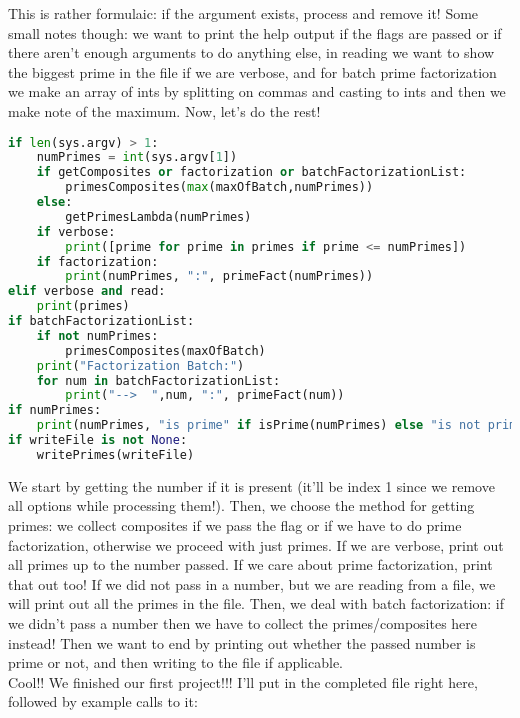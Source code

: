 \documentclass[12pt]{article}
\begin{document}
This is rather formulaic: if the argument exists, process and remove it! Some small notes though: we want to print the help output if the flags are passed or if there aren't enough arguments to do anything else, in reading we want to show the biggest prime in the file if we are verbose, and for batch prime factorization we make an array of ints by splitting on commas and casting to ints and then we make note of the maximum. Now, let's do the rest!\\
\begin{lstlisting}[language=Python]
if len(sys.argv) > 1:
    numPrimes = int(sys.argv[1])
    if getComposites or factorization or batchFactorizationList:
        primesComposites(max(maxOfBatch,numPrimes))
    else:
        getPrimesLambda(numPrimes)
    if verbose:
        print([prime for prime in primes if prime <= numPrimes])
    if factorization:
        print(numPrimes, ":", primeFact(numPrimes))
elif verbose and read:
    print(primes)
if batchFactorizationList:
    if not numPrimes:
        primesComposites(maxOfBatch)
    print("Factorization Batch:")
    for num in batchFactorizationList:
        print("-->  ",num, ":", primeFact(num))
if numPrimes:
    print(numPrimes, "is prime" if isPrime(numPrimes) else "is not prime")
if writeFile is not None:
    writePrimes(writeFile)
\end{lstlisting}
We start by getting the number if it is present (it'll be index 1 since we remove all options while processing them!). Then, we choose the method for getting primes: we collect composites if we pass the flag or if we have to do prime factorization, otherwise we proceed with just primes. If we are verbose, print out all primes up to the number passed. If we care about prime factorization, print that out too! If we did not pass in a number, but we are reading from a file, we will print out all the primes in the file. Then, we deal with batch factorization: if we didn't pass a number then we have to collect the primes/composites here instead! Then we want to end by printing out whether the passed number is prime or not, and then writing to the file if applicable.\\
Cool!! We finished our first project!!! I'll put in the completed file right here, followed by example calls to it:\\
\end{document}
